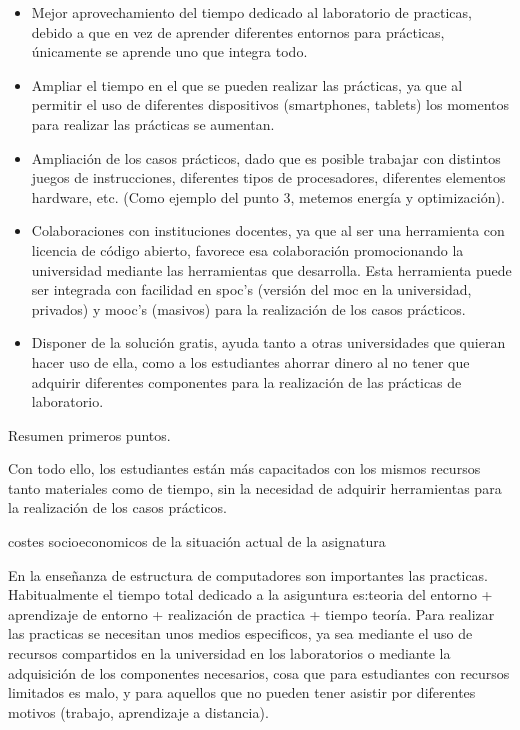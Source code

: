 \begin{itemize}
\item Mejor aprovechamiento del tiempo dedicado al laboratorio de practicas, debido a que en vez de aprender diferentes entornos para prácticas, únicamente se aprende uno que integra todo.

\item Ampliar el tiempo en el que se pueden realizar las prácticas, ya que al permitir el uso de diferentes dispositivos (smartphones, tablets) los momentos para realizar las prácticas se aumentan.

\item Ampliación de los casos prácticos, dado que es posible trabajar con distintos juegos de instrucciones, diferentes tipos de procesadores, diferentes elementos hardware, etc. (Como ejemplo del punto 3, metemos energía y optimización).

\item Colaboraciones con instituciones docentes, ya que al ser una herramienta con licencia de código abierto, favorece esa colaboración promocionando la universidad mediante las herramientas que desarrolla.
Esta herramienta puede ser integrada con facilidad en spoc's (versión del moc en la universidad, privados) y mooc's (masivos) para la realización de los casos prácticos.

\item Disponer de la solución gratis, ayuda tanto a otras universidades que quieran hacer uso de ella, como a los estudiantes ahorrar dinero al no tener que adquirir diferentes componentes para la realización de las prácticas de laboratorio.

\end{itemize}

Resumen primeros puntos.

Con todo ello, los estudiantes están más capacitados con los mismos recursos tanto materiales como de tiempo, sin la necesidad de adquirir herramientas para la realización de los casos prácticos.

costes socioeconomicos de la situación actual de la asignatura

En la enseñanza de estructura de computadores son importantes las practicas. Habitualmente el tiempo total dedicado a la asiguntura es:teoria del entorno + aprendizaje de entorno + realización de practica + tiempo teoría. Para realizar las practicas se necesitan unos medios especificos, ya sea mediante el uso de recursos compartidos en la universidad en los laboratorios o mediante la adquisición de los componentes necesarios, cosa que para estudiantes con recursos limitados es malo, y para aquellos que no pueden tener asistir por diferentes motivos (trabajo, aprendizaje a distancia).


